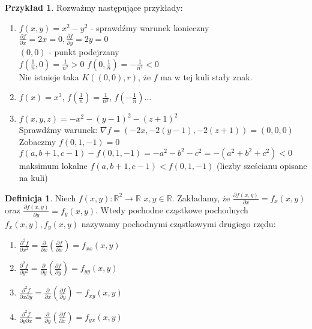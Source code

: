 \documentclass{article}
\theoremstyle{definition}
\newtheorem{de}{Definicja}[subsection]
\theoremstyle{definition}
\theoremstyle{definition}
\newtheorem{pk}{Przykład}[subsection]
\theoremstyle{definition}
\begin{document}
\begin{pk}
    Rozważmy następujące przykłady:
    \begin{enumerate}
        \item $f(x,y)=x^2-y^2$ - sprawdźmy warunek konieczny\\
        $\frac{\partial f}{\partial x} = 2x = 0, \frac{\partial f}{\partial y} = 2y = 0$\\
        $(0,0)$ - punkt podejrzany\\
        $f(\frac{1}{n},0) = \frac{1}{n^2} > 0$
        $f(0, \frac{1}{n}) = -\frac{1}{n^2} < 0$\\
        Nie istnieje taka $K((0,0),r)$, że $f$ ma w tej kuli stały znak.
        \item $f(x)=x^3$, $f\left(\frac{1}{n}\right) = \frac{1}{n^3}$, $f\left(-\frac{1}{n}\right)\dots$
        \item $f(x,y,z) = -x^2 - (y-1)^2 - (z+1)^2$\\
        Sprawdźmy warunek: $\nabla f = (-2x, -2(y-1), -2(z+1))=(0,0,0)$\\
        Zobaczmy $f(0,1,-1)=0$\\
        $f(a,b+1,c-1) - f(0,1,-1) = -a^2 -b^2 -c^2 = -(a^2+b^2+c^2) < 0$ maksimum lokalne
        $f(a,b+1,c-1) < f(0,1,-1)$ (liczby sześcianu opisane na kuli)\\
    \end{enumerate}
\end{pk}

\begin{de}
    Niech $f(x,y): \mathbb{R}^2 \rightarrow \mathbb{R}$ $x,y\in\mathbb{R}$.
    Zakładamy, że $\frac{\partial f(x,y)}{\partial x} = f_x(x,y)$ oraz $\frac{\partial f(x,y)}{\partial y} = f_y(x,y)$.
    Wtedy pochodne cząstkowe pochodnych $f_x(x,y), f_y(x,y)$ nazywamy pochodnymi cząstkowymi drugiego rzędu:

    \begin{enumerate}
        \item $\frac{\partial^2 f}{\partial x^2} = \frac{\partial}{\partial x} \left(\frac{\partial f}{\partial x}\right) = f_{xx} (x,y)$
        \item $\frac{\partial^2 f}{\partial y^2} = \frac{\partial}{\partial y} \left(\frac{\partial f}{\partial y}\right) = f_{yy} (x,y)$
        \item $\frac{\partial^2 f}{\partial x \partial y} = \frac{\partial}{\partial x} \left(\frac{\partial f}{\partial y}\right) = f_{xy} (x,y)$
        \item $\frac{\partial^2 f}{\partial y \partial x} = \frac{\partial}{\partial y} \left(\frac{\partial f}{\partial x}\right) = f_{yx} (x,y)$
    \end{enumerate}
\end{de}
\end{document}
